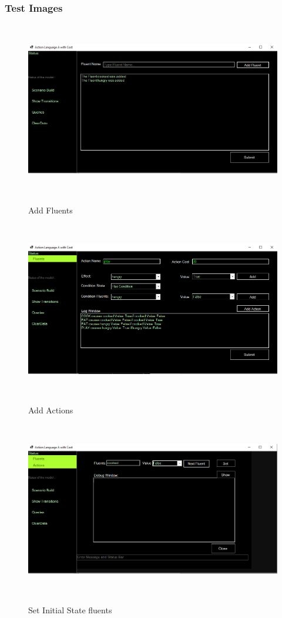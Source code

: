 \documentclass[11pt]{article}
\begin{document}
	\subsubsection*{Test Images}\label{par:502}
	\begin{figure}[H]
		\centering
		\includegraphics[width=6in,height=3in]{./testImages/Example3/img1.png}
		\label{Figure:f03.1}
		\caption{Add Fluents}
	\end{figure}
	\begin{figure}[H]
		\centering
		\includegraphics[width=6in,height=3in]{./testImages/Example3/img2.png}
		\label{Figure:f03.2}
		\caption{Add Actions}
	\end{figure}
	\begin{figure}[H]
		\centering
		\includegraphics[width=6in,height=3in]{./testImages/Example3/img3.png}
		\label{Figure:f03.3}
		\caption{Set Initial State fluents}
	\end{figure}
\end{document}
